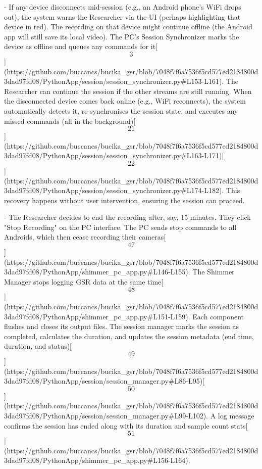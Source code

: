 \documentclass[12pt,a4paper]{article}
\begin{document}
- If any device disconnects mid-session (e.g., an Android phone's WiFi
  drops out), the system warns the Researcher via the UI (perhaps
  highlighting that device in red). The recording on that device might
  continue offline (the Android app will still save its local video).
  The PC's Session Synchronizer marks the device as offline and queues
  any commands for
  it[\[3\]](https://github.com/buccancs/bucika_gsr/blob/7048f7f6a7536f5cd577ed2184800d3dad97fd08/PythonApp/session/session_synchronizer.py#L153-L161).
  The Researcher can continue the session if the other streams are still
  running. When the disconnected device comes back online (e.g., WiFi
  reconnects), the system automatically detects it, re-synchronises the
  session state, and executes any missed commands (all in the
  background)[\[21\]](https://github.com/buccancs/bucika_gsr/blob/7048f7f6a7536f5cd577ed2184800d3dad97fd08/PythonApp/session/session_synchronizer.py#L163-L171)[\[22\]](https://github.com/buccancs/bucika_gsr/blob/7048f7f6a7536f5cd577ed2184800d3dad97fd08/PythonApp/session/session_synchronizer.py#L174-L182).
  This recovery happens without user intervention, ensuring the session
  can proceed.

- The Researcher decides to end the recording after, say, 15 minutes.
  They click "Stop Recording" on the PC interface. The PC sends stop
  commands to all Androids, which then cease recording their
  cameras[\[47\]](https://github.com/buccancs/bucika_gsr/blob/7048f7f6a7536f5cd577ed2184800d3dad97fd08/PythonApp/shimmer_pc_app.py#L146-L155).
  The Shimmer Manager stops logging GSR data at the same
  time[\[48\]](https://github.com/buccancs/bucika_gsr/blob/7048f7f6a7536f5cd577ed2184800d3dad97fd08/PythonApp/shimmer_pc_app.py#L151-L159).
  Each component flushes and closes its output files. The session
  manager marks the session as completed, calculates the duration, and
  updates the session metadata (end time, duration, and
  status)[\[49\]](https://github.com/buccancs/bucika_gsr/blob/7048f7f6a7536f5cd577ed2184800d3dad97fd08/PythonApp/session/session_manager.py#L86-L95)[\[50\]](https://github.com/buccancs/bucika_gsr/blob/7048f7f6a7536f5cd577ed2184800d3dad97fd08/PythonApp/session/session_manager.py#L99-L102).
  A log message confirms the session has ended along with its duration
  and sample count
  stats[\[51\]](https://github.com/buccancs/bucika_gsr/blob/7048f7f6a7536f5cd577ed2184800d3dad97fd08/PythonApp/shimmer_pc_app.py#L156-L164).
\end{document}
